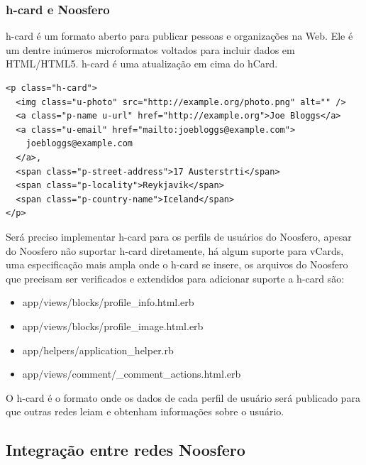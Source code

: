 \documentclass[12pt]{article}
\begin{document}
\subsubsection{h-card e Noosfero}

h-card é um formato aberto para publicar pessoas e organizações na Web. Ele é
um dentre inúmeros microformatos voltados para incluir dados em HTML/HTML5.
h-card é uma atualização em cima do hCard.

\begin{framed}
\begin{lstlisting}[caption=Exemplo de h-card]
<p class="h-card">
  <img class="u-photo" src="http://example.org/photo.png" alt="" />
  <a class="p-name u-url" href="http://example.org">Joe Bloggs</a>
  <a class="u-email" href="mailto:joebloggs@example.com">
    joebloggs@example.com
  </a>, 
  <span class="p-street-address">17 Austerstrti</span>
  <span class="p-locality">Reykjavik</span>
  <span class="p-country-name">Iceland</span>
</p>
\end{lstlisting}
\end{framed}

Será preciso implementar h-card para os perfils de usuários do Noosfero,
apesar do Noosfero não suportar h-card diretamente, há algum suporte para
vCards, uma especificação mais ampla onde o h-card se insere, os arquivos do
Noosfero que precisam ser verificados e extendidos para adicionar suporte a
h-card são:

\begin{itemize}
  \item app/views/blocks/profile\_info.html.erb
  \item app/views/blocks/profile\_image.html.erb
  \item app/helpers/application\_helper.rb
  \item app/views/comment/\_comment\_actions.html.erb
\end{itemize}

O h-card é o formato onde os dados de cada perfil de usuário será publicado
para que outras redes leiam e obtenham informações sobre o usuário.

\subsection{Integração entre redes Noosfero}
\label{sessao-oauth}
\end{document}
